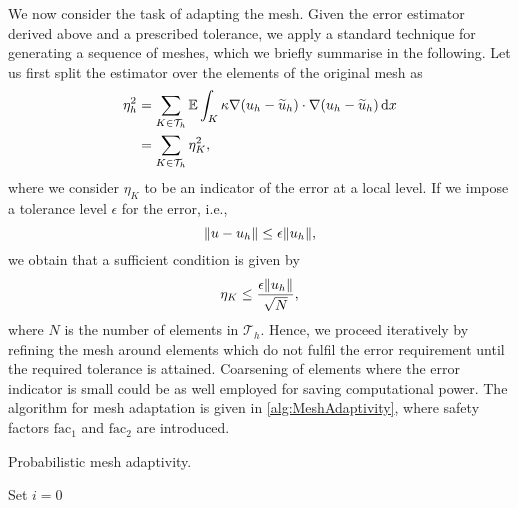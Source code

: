 We now consider the task of adapting the mesh. Given the error estimator derived above and a prescribed tolerance, we apply a standard technique for generating a sequence of meshes, which we briefly summarise in the following. Let us first split the estimator over the elements of the original mesh as
\begin{equation}
\begin{aligned}
	\eta_h^2 &= \sum_{K\in \mathcal T_h} \operatorname{\mathbb{E}} \int_{K} \kappa \nabla (u_h - \widetilde u_h) \cdot \nabla (u_h - \widetilde u_h) \,\mathrm{d} x\\
	&= \sum_{K \in \mathcal T_h} \eta_K^2,
\end{aligned}
\end{equation}
where we consider $\eta_K$ to be an indicator of the error at a local level. If we impose a tolerance level $\epsilon$ for the error, i.e.,
\begin{equation}
	\lVert u - u_h\rVert \leq \epsilon \lVert u_h\rVert,  
\end{equation}	 
we obtain that a sufficient condition is given by 
\begin{equation}
	\eta_K \leq \frac{\epsilon \lVert u_h\rVert}{\sqrt{N}},
\end{equation}
where $N$ is the number of elements in $\mathcal T_h$. Hence, we proceed iteratively by refining the mesh around elements which do not fulfil the error requirement until the required tolerance is attained. Coarsening of elements where the error indicator is small could be as well employed for saving computational power. The algorithm for mesh adaptation is given in \cref{alg:MeshAdaptivity}, where safety factors $\mathrm{fac}_1$ and $\mathrm{fac}_2$ are introduced. 

\begin{algorithm}[t]
	\caption{Probabilistic mesh adaptivity.}
	\label{alg:MeshAdaptivity}
	Set $i = 0$ \;
\end{algorithm}

